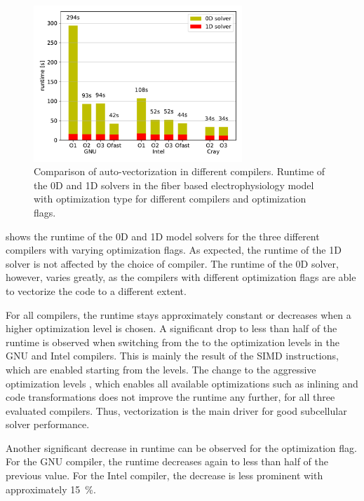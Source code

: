 \begin{figure}
  \centering%
  \includegraphics[width=0.7\textwidth]{images/results/studies/compilers.pdf}%
  \caption{Comparison of auto-vectorization in different compilers. Runtime of the 0D and 1D solvers in the fiber based electrophysiology model with  optimization type for different compilers and optimization flags.}%
  \label{fig:compilers}%
\end{figure}%

 shows the runtime of the 0D and 1D model solvers for the three different compilers with varying optimization flags.
As expected, the runtime of the 1D solver is not affected by the choice of compiler. The runtime of the 0D solver, however, varies greatly, as the compilers with different optimization flags are able to vectorize the code to a different extent.

For all compilers, the runtime stays approximately constant or decreases when a higher optimization level is chosen. A significant drop to less than half of the runtime is observed when switching from the  to the  optimization levels in the GNU and Intel compilers. This is mainly the result of the SIMD instructions, which are enabled starting from the  levels.
The change to the aggressive optimization levels , which enables all available optimizations such as inlining and code transformations does not improve the runtime any further, for all three evaluated compilers. Thus, vectorization is the main driver for good subcellular solver performance.

Another significant decrease in runtime can be observed for the  optimization flag. For the GNU compiler, the runtime decreases again to less than half of the previous value. For the Intel compiler, the decrease is less prominent with approximately \SI{15}{\percent}. 


